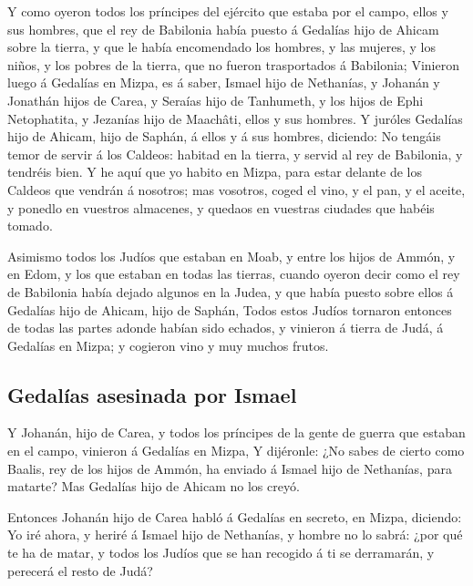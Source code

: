  Y como oyeron todos los príncipes del ejército que estaba
por el campo, ellos y sus hombres, que el rey de Babilonia había puesto
á Gedalías hijo de Ahicam sobre la tierra, y que le había encomendado
los hombres, y las mujeres, y los niños, y los pobres de la tierra, que
no fueron trasportados á Babilonia;  Vinieron luego á
Gedalías en Mizpa, es á saber, Ismael hijo de Nethanías, y Johanán y
Jonathán hijos de Carea, y Seraías hijo de Tanhumeth, y los hijos de
Ephi Netophatita, y Jezanías hijo de Maachâti, ellos y sus hombres.
 Y juróles Gedalías hijo de Ahicam, hijo de Saphán, á
ellos y á sus hombres, diciendo: No tengáis temor de servir á los
Caldeos: habitad en la tierra, y servid al rey de Babilonia, y tendréis
bien.  Y he aquí que yo habito en Mizpa, para estar
delante de los Caldeos que vendrán á nosotros; mas vosotros, coged el
vino, y el pan, y el aceite, y ponedlo en vuestros almacenes, y quedaos
en vuestras ciudades que habéis tomado.

 Asimismo todos los Judíos que estaban en Moab, y entre
los hijos de Ammón, y en Edom, y los que estaban en todas las tierras,
cuando oyeron decir como el rey de Babilonia había dejado algunos en la
Judea, y que había puesto sobre ellos á Gedalías hijo de Ahicam, hijo de
Saphán,  Todos estos Judíos tornaron entonces de todas
las partes adonde habían sido echados, y vinieron á tierra de Judá, á
Gedalías en Mizpa; y cogieron vino y muy muchos frutos.

\hypertarget{gedaluxedas-asesinada-por-ismael}{%
\subsection{Gedalías asesinada por
Ismael}\label{gedaluxedas-asesinada-por-ismael}}

 Y Johanán, hijo de Carea, y todos los príncipes de la
gente de guerra que estaban en el campo, vinieron á Gedalías en Mizpa,
 Y dijéronle: ¿No sabes de cierto como Baalis, rey de los
hijos de Ammón, ha enviado á Ismael hijo de Nethanías, para matarte? Mas
Gedalías hijo de Ahicam no los creyó.

 Entonces Johanán hijo de Carea habló á Gedalías en
secreto, en Mizpa, diciendo: Yo iré ahora, y heriré á Ismael hijo de
Nethanías, y hombre no lo sabrá: ¿por qué te ha de matar, y todos los
Judíos que se han recogido á ti se derramarán, y perecerá el resto de
Judá?


